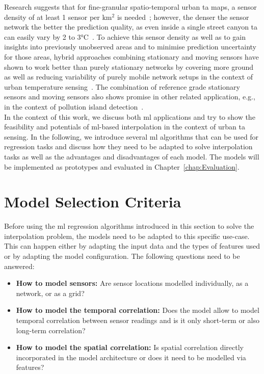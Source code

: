 Research suggests that for fine-granular spatio-temporal urban \gls{ta} maps, a sensor density of at least 1 sensor per km$^{2}$ is needed~\cite{venter2020hyperlocal}; however, the denser the sensor network the better the prediction quality, as even inside a single street canyon \gls{ta} can easily vary by 2 to 3°C~\cite{sugawara2008temperature}.
To achieve this sensor density as well as to gain insights into previously unobserved areas and to minimise prediction uncertainty for those areas, hybrid approaches combining stationary and moving sensors have shown to work better than purely stationary networks by covering more ground as well as reducing variability of purely mobile network setups in the context of urban temperature sensing~\cite{yang2019designing}. The combination of reference grade stationary sensors and moving sensors also shows promise in other related application, e.g., in the context of pollution island detection~\cite{iyer2022modeling}.\\
In the context of this work, we discuss both \gls{ml} applications and try to show the feasibility and potentials of \gls{ml}-based interpolation in the context of urban \gls{ta} sensing.
In the following, we introduce several \gls{ml} algorithms that can be used for regression tasks and discuss how they need to be adapted to solve interpolation tasks as well as the advantages and disadvantages of each model. The models will be implemented as prototypes and evaluated in Chapter~\ref{chap:Evaluation}.

\section{Model Selection Criteria}
\label{sec: model selection criteria}

Before using the \gls{ml} regression algorithms introduced in this section to solve the interpolation problem, the models need to be adapted to this specific use-case. This can happen either by adapting the input data and the types of features used or by adapting the model configuration. The following questions need to be answered:

\begin{itemize}
    \item \textbf{How to model sensors:} Are sensor locations modelled individually, as a network, or as a grid?
    \item \textbf{How to model the temporal correlation:} Does the model allow to model temporal correlation between sensor readings and is it only short-term or also long-term correlation?
    \item \textbf{How to model the spatial correlation:} Is spatial correlation directly incorporated in the model architecture or does it need to be modelled via features?
\end{itemize}

